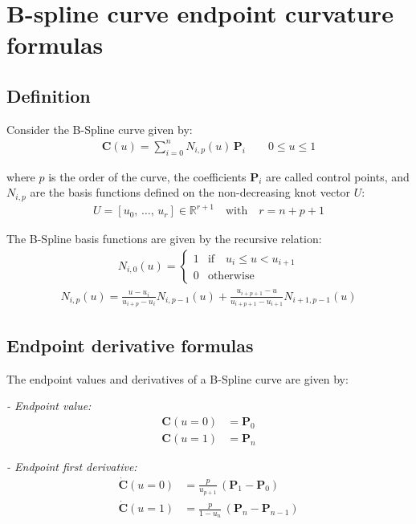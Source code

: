 \section{B-spline curve endpoint curvature formulas}
\label{sec:bspline}

\subsection{Definition}
Consider the B-Spline curve given by:
\begin{align}
    \label{eq:def_bspline_curve}
    \mathbf{C}(u)=\sum_{i=0}^{n} N_{i,p}(u)\, \mathbf{P}_{i} \quad \quad 0 \leq u \leq 1
\end{align}

where $p$ is the order of the curve, the coefficients $\mathbf{P}_{i}$ are called control points, and $N_{i,p}$ are the basis functions defined on the non-decreasing knot vector $U$:
\begin{align}
    U = [u_0,\, \dots,\, u_{r}] \in \mathds{R}^{r+1} \quad \text{with} \quad r = n + p + 1
\end{align}

The B-Spline basis functions are given by the recursive relation:
\begin{align}
    N_{i,0}(u) =  \begin{cases}
    1& \mathrm{if} \quad u_{i}\leq u<u_{i+1}\\
    0& \mathrm{otherwise}
    \end{cases}
\end{align}
\begin{align}
 N_{i,p}(u)= \frac {u-u_{i}}{u_{i+p}-u_{i}} N_{i,p-1}(u) + \frac {u_{i+p+1}-u}{u_{i+p+1}-u_{i+1}} N_{i+1,p-1}(u)
\end{align}


\subsection{Endpoint derivative formulas}

The endpoint values and derivatives of a B-Spline curve are given by:

\textit{- Endpoint value:}
    \begin{align*}
        \mathbf{C}(u=0) &= \mathbf{P}_{0} \\
        \mathbf{C}(u=1) &= \mathbf{P}_{n}
    \end{align*}
    
\textit{- Endpoint first derivative:}
    \begin{align*}
        \mathbf{\dot{C}}(u=0) &= \frac{p}{u_{p+1}}\,(\mathbf{P}_{1} - \mathbf{P}_{0}) \\
        \mathbf{\dot{C}}(u=1) &= \frac{p}{1-u_{n}}\,(\mathbf{P}_{n} - \mathbf{P}_{n-1})
    \end{align*}

